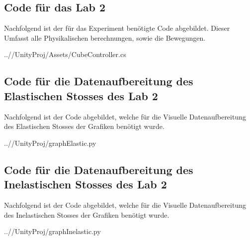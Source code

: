 \documentclass[../main.tex]{subfiles}
\begin{document}
    \subsection{Code für das Lab 2}
    Nachfolgend ist der für das Experiment benötigte Code abgebildet.
    Dieser Umfasst alle Physikalischen berechnungen, sowie die Bewegungen.

%    
    \begin{lstinputlisting}[label={lst:CubeController}]
        {..//UnityProj/Assets/CubeController.cs}
    \end{lstinputlisting}

    \subsection{Code für die Datenaufbereitung des Elastischen Stosses des Lab 2}
    Nachfolgend ist der Code abgebildet, welche für die Visuelle Datenaufbereitung des Elastischen Stosses
    der Grafiken benötigt wurde.
    \begin{lstinputlisting}[label={lst:Elastischen}]
    {..//UnityProj/graphElastic.py}
    \end{lstinputlisting}

    \subsection{Code für die Datenaufbereitung des Inelastischen Stosses des Lab 2}
    Nachfolgend ist der Code abgebildet, welche für die Visuelle Datenaufbereitung des Inelastischen Stosses
    der Grafiken benötigt wurde.
    \begin{lstinputlisting}[label={lst:graphInelastic}]
        {..//UnityProj/graphInelastic.py}
    \end{lstinputlisting}
\end{document}
